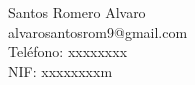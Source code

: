Santos Romero Alvaro \\ %
alvarosantosrom9@gmail.com \\ %
Teléfono: xxxxxxxx \\ %
NIF: xxxxxxxxm \\ %
